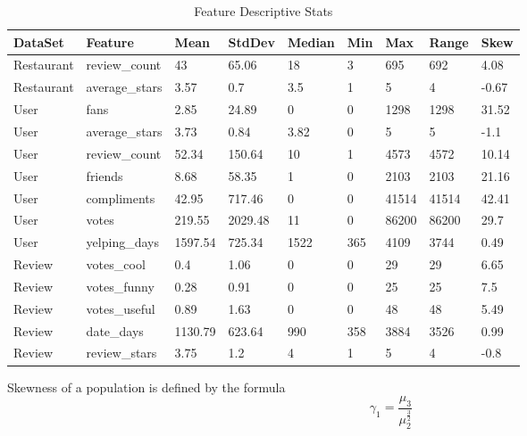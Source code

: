 \documentclass[12pt]{article}
\begin{document}
\begin{table}[h]
	\centering
	\begin{tabular}{lllllllll}
		\hline
		DataSet    & Feature        & Mean    & StdDev  & Median & Min & Max   & Range & Skew  \\ \hline
		Restaurant & review\_count  & 43      & 65.06   & 18     & 3   & 695   & 692   & 4.08  \\
		Restaurant & average\_stars & 3.57    & 0.7     & 3.5    & 1   & 5     & 4     & -0.67 \\ \hline
		User       & fans           & 2.85    & 24.89   & 0      & 0   & 1298  & 1298  & 31.52 \\
		User       & average\_stars & 3.73    & 0.84    & 3.82   & 0   & 5     & 5     & -1.1  \\
		User       & review\_count  & 52.34   & 150.64  & 10     & 1   & 4573  & 4572  & 10.14 \\
		User       & friends        & 8.68    & 58.35   & 1      & 0   & 2103  & 2103  & 21.16 \\
		User       & compliments    & 42.95   & 717.46  & 0      & 0   & 41514 & 41514 & 42.41 \\
		User       & votes          & 219.55  & 2029.48 & 11     & 0   & 86200 & 86200 & 29.7  \\
		User       & yelping\_days  & 1597.54 & 725.34  & 1522   & 365 & 4109  & 3744  & 0.49  \\ \hline
		Review     & votes\_cool    & 0.4     & 1.06    & 0      & 0   & 29    & 29    & 6.65  \\
		Review     & votes\_funny   & 0.28    & 0.91    & 0      & 0   & 25    & 25    & 7.5   \\
		Review     & votes\_useful  & 0.89    & 1.63    & 0      & 0   & 48    & 48    & 5.49  \\
		Review     & date\_days     & 1130.79 & 623.64  & 990    & 358 & 3884  & 3526  & 0.99  \\
		Review     & review\_stars  & 3.75    & 1.2     & 4      & 1   & 5     & 4     & -0.8  \\ \hline
	\end{tabular}
	\caption{Feature Descriptive Stats}
	\label{feature_descriptive_stats}
\end{table}

Skewness of a population is defined by the formula 
\begin{equation}
\gamma_{1}=\frac{\mu_{3}}{\mu_{2}^{\frac{3}{2}}}
\end{equation}
\end{document}
